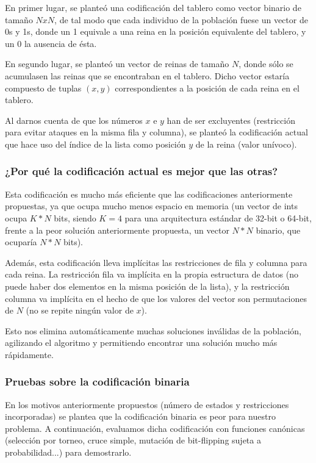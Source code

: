 \documentclass[12pt]{article}
\begin{document}
En primer lugar, se planteó una codificación del tablero como vector binario de tamaño $NxN$, de tal modo que cada individuo de la población fuese un vector de 0s y 1s, donde un 1 equivale a una reina en la posición equivalente del tablero, y un 0 la ausencia de ésta.

En segundo lugar, se planteó un vector de reinas de tamaño $N$, donde sólo se acumulasen las reinas que se encontraban en el tablero. Dicho vector estaría compuesto de tuplas $(x,y)$ correspondientes a la posición de cada reina en el tablero.

Al darnos cuenta de que los números $x$ e $y$ han de ser excluyentes (restricción para evitar ataques en la misma fila y columna), se planteó la codificación actual que hace uso del índice de la lista como posición $y$ de la reina (valor unívoco).

\subsubsection{¿Por qué la codificación actual es mejor que las otras?}

Esta codificación es mucho más eficiente que las codificaciones anteriormente propuestas, ya que ocupa mucho menos espacio en memoria (un vector de ints ocupa $K*N$ bits, siendo $K=4$ para una arquitectura estándar de 32-bit o 64-bit, frente a la peor solución anteriormente propuesta, un vector $N*N$ binario, que ocuparía $N*N$ bits).

Además, esta codificación lleva implícitas las restricciones de fila y columna para cada reina. La restricción fila va implícita en la propia estructura de datos (no puede haber dos elementos en la misma posición de la lista), y la restricción columna va implícita en el hecho de que los valores del vector son permutaciones de $N$ (no se repite ningún valor de $x$).

Esto nos elimina automáticamente muchas soluciones inválidas de la población, agilizando el algoritmo y permitiendo encontrar una solución mucho más rápidamente.

\subsubsection{Pruebas sobre la codificación binaria}

En los motivos anteriormente propuestos (número de estados y restricciones incorporadas) se plantea que la codificación binaria es peor para nuestro problema. A continuación, evaluamos dicha codificación con funciones canónicas (selección por torneo, cruce simple, mutación de bit-flipping sujeta a probabilidad...) para demostrarlo.
\end{document}
